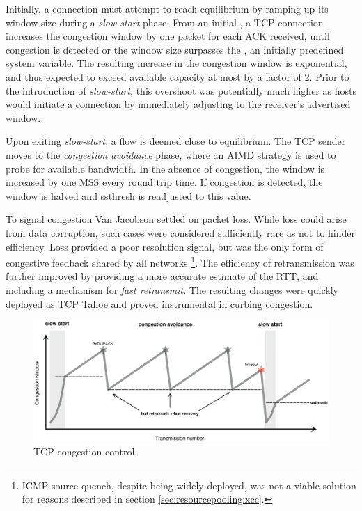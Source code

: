 Initially, a connection must attempt to reach equilibrium by ramping up its window size during a \textit{slow-start} phase. 
From an initial , a \ac{TCP} connection increases the congestion window by one packet for each \ac{ACK} received, until congestion is detected or the window size surpasses the , an initially predefined system variable.
The resulting increase in the congestion window is exponential, and thus expected to exceed available capacity at most by a factor of 2. 
Prior to the introduction of \textit{slow-start}, this overshoot was potentially much higher as hosts would initiate a connection by immediately adjusting to the receiver's advertised window. 

Upon exiting \textit{slow-start}, a flow is deemed close to equilibrium.
The \ac{TCP} sender moves to the \textit{congestion avoidance} phase, where an \ac{AIMD} strategy is used to probe for available bandwidth. 
In the absence of congestion, the window is increased by one \ac{MSS} every round trip time.
If congestion is detected, the window is halved and \ac{ssthresh} is readjusted to this value.

To signal congestion Van Jacobson settled on packet loss. 
While loss could arise from data corruption, such cases were considered sufficiently rare as not to hinder efficiency. 
Loss provided a poor resolution signal, but was the only form of congestive feedback shared by all networks 
\footnote{\ac{ICMP} source quench, despite being widely deployed, was not a viable solution for reasons described in section \ref{sec:resourcepooling:xcc}.}.
The efficiency of retransmission was further improved by providing a more accurate estimate of the \ac{RTT}, and including a mechanism for \textit{fast retransmit}. 
The resulting changes were quickly deployed as \ac{TCP} Tahoe and proved instrumental in curbing congestion. 


\begin{figure}
    \centering
    \includegraphics[width=5.0in]{figures/resourcepooling/tcpnewreno}
    \caption{\acs{TCP} congestion control.}
    \label{fig:tcpcc}
\end{figure}

